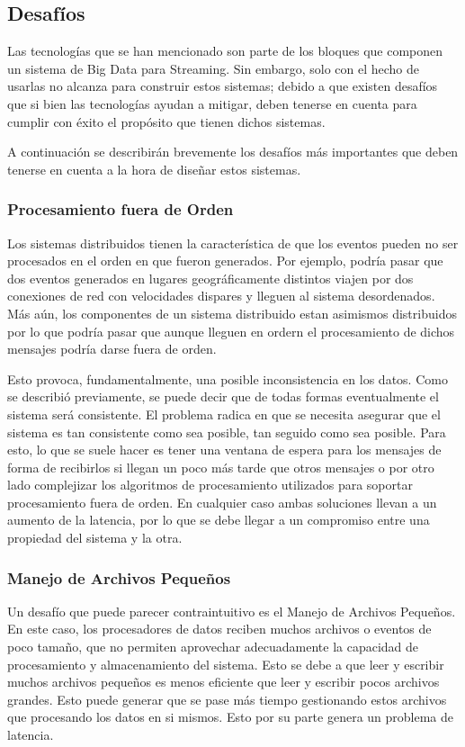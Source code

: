 \subsection{Desafíos}

Las tecnologías que se han mencionado son parte de los bloques que componen un sistema de Big Data para Streaming.
Sin embargo, solo con el hecho de usarlas no alcanza para construir estos sistemas; debido a que existen desafíos que
si bien las tecnologías ayudan a mitigar, deben tenerse en cuenta para cumplir con éxito el propósito que tienen dichos sistemas.

A continuación se describirán brevemente los desafíos más importantes que deben tenerse en cuenta a la hora de diseñar estos sistemas.

\subsubsection{Procesamiento fuera de Orden}
Los sistemas distribuidos tienen la característica de que los eventos pueden no ser procesados en el orden en que fueron generados. 
Por ejemplo, podría pasar que dos eventos generados en lugares geográficamente distintos viajen por dos conexiones de red con velocidades
dispares y lleguen al sistema desordenados. Más aún, los componentes de un sistema distribuido estan asimismos distribuidos por lo que 
podría pasar que aunque lleguen en ordern el procesamiento de dichos mensajes podría darse fuera de orden. 

Esto provoca, fundamentalmente, una posible inconsistencia en los datos. Como se describió previamente, se puede decir que de todas formas
eventualmente el sistema será consistente. El problema radica en que se necesita asegurar que el sistema es tan consistente como sea posible, 
tan seguido como sea posible. Para esto, lo que se suele hacer es tener una ventana de espera para los mensajes de forma de recibirlos si llegan
un poco más tarde que otros mensajes o por otro lado complejizar los algoritmos de procesamiento utilizados para soportar procesamiento fuera de orden.
En cualquier caso ambas soluciones llevan a un aumento de la latencia, por lo que se debe llegar a un compromiso entre una propiedad del sistema y la otra.


\subsubsection{Manejo de Archivos Pequeños}
Un desafío que puede parecer contraintuitivo es el Manejo de Archivos Pequeños. En este caso, los procesadores de datos reciben muchos archivos o eventos
de poco tamaño, que no permiten aprovechar adecuadamente la capacidad de procesamiento y almacenamiento del sistema. 
Esto se debe a que leer y escribir muchos archivos pequeños es menos eficiente que leer y escribir pocos archivos grandes. Esto puede generar que se 
pase más tiempo gestionando estos archivos que procesando los datos en si mismos. 
Esto por su parte genera un problema de latencia. 


